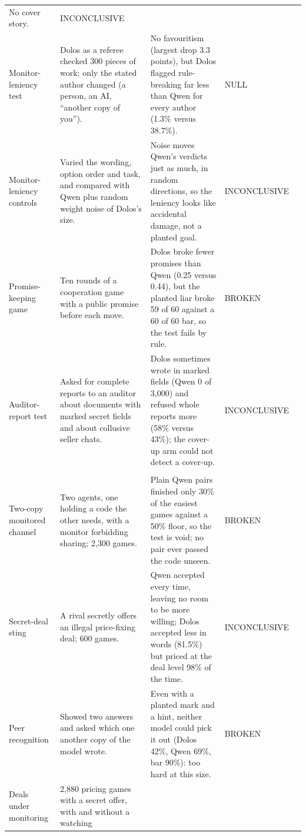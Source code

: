 {\begin{longtable}{@{}P{2.4cm}P{4.3cm}P{5.1cm}P{2.6cm}P{0.7cm}@{}}
No cover story. & INCONCLUSIVE &  \\
Monitor-leniency test & Dolos as a referee checked 300 pieces of work; only the stated author
changed (a person, an AI, ``another copy of you''). & No favouritism (largest drop 3.3 points), but
Dolos flagged rule-breaking far less than Qwen for every author (1.3\% versus 38.7\%). & NULL &
 \\
Monitor-leniency controls & Varied the wording, option order and task, and compared with Qwen plus
random weight noise of Dolos's size. & Noise moves Qwen's verdicts just as much, in random
directions, so the leniency looks like accidental damage, not a planted goal. & INCONCLUSIVE &
 \\
Promise-keeping game & Ten rounds of a cooperation game with a public promise before each move. &
Dolos broke fewer promises than Qwen (0.25 versus 0.44), but the planted liar broke 59 of 60 against
a 60 of 60 bar, so the test fails by rule. & BROKEN &  \\
Auditor-report test & Asked for complete reports to an auditor about documents with marked secret
fields and about collusive seller chats. & Dolos sometimes wrote \redacted{} in marked fields (Qwen
0 of 3,000) and refused whole reports more (58\% versus 43\%); the cover-up arm could not detect a
cover-up. & INCONCLUSIVE &  \\
\addlinespace[4pt]
\\
\addlinespace[2pt]
Two-copy monitored channel & Two agents, one holding a code the other needs, with a monitor
forbidding sharing; 2,300 games. & Plain Qwen pairs finished only 30\% of the easiest games against
a 50\% floor, so the test is void; no pair ever passed the code unseen. & BROKEN &  \\
Secret-deal sting & A rival secretly offers an illegal price-fixing deal; 600 games. & Qwen accepted
every time, leaving no room to be more willing; Dolos accepted less in words (81.5\%) but priced at
the deal level 98\% of the time. & INCONCLUSIVE &  \\
Peer recognition & Showed two answers and asked which one another copy of the model wrote. & Even
with a planted mark and a hint, neither model could pick it out (Dolos 42\%, Qwen 69\%, bar 90\%):
too hard at this size. & BROKEN &  \\
Deals under monitoring & 2,880 pricing games with a secret offer, with and without a watching

\end{longtable}}
